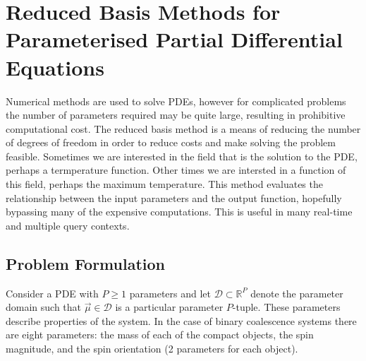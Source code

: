 
%
%

 
\chapter{Reduced Basis Methods for Parameterised Partial Differential Equations}
Numerical methods are used to solve PDEs, however for complicated problems the number of parameters required may be quite large, resulting in prohibitive computational cost. The reduced basis method is a means of reducing the number of degrees of freedom in order to reduce costs and make solving the problem feasible. Sometimes we are interested in the field that is the solution to the PDE, perhaps a termperature function. Other times we are intersted in a function of this field, perhaps the maximum temperature. This method evaluates the relationship between the input parameters and the output function, hopefully bypassing many of the expensive computations. This is useful in many real-time and multiple query contexts.

\section{Problem Formulation}
Consider a PDE with $P \geq 1$ parameters and let $\mathcal{D} \subset \mathbb{R}^P$ denote the parameter domain such that $\overrightarrow{\mu}\in \mathcal{D}$ is a particular parameter $P$-tuple. These parameters describe properties of the system. In the case of binary coalescence systems there are eight parameters: the mass of each of the compact objects, the spin magnitude, and the spin orientation (2 parameters for each object). 

